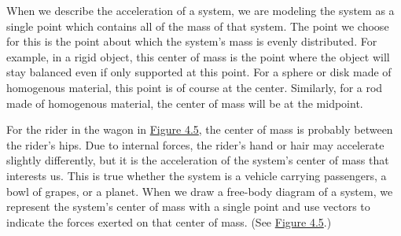\documentclass[
]{book}
\begin{document}
When we describe the acceleration of a system, we are modeling the
system as a single point which contains all of the mass of that system.
The point we choose for this is the point about which the system's mass
is evenly distributed. For example, in a rigid object, this center of
mass is the point where the object will stay balanced even if only
supported at this point. For a sphere or disk made of homogenous
material, this point is of course at the center. Similarly, for a rod
made of homogenous material, the center of mass will be at the midpoint.

For the rider in the wagon in \protect\hyperlink{import-auto-id1993910}{Figure 4.5}, the
center of mass is probably between the rider's hips. Due to internal
forces, the rider's hand or hair may accelerate slightly differently,
but it is the acceleration of the system's center of mass that interests
us. This is true whether the system is a vehicle carrying passengers, a
bowl of grapes, or a planet. When we draw a free-body diagram of a
system, we represent the system's center of mass with a single point and
use vectors to indicate the forces exerted on that center of mass. (See
\protect\hyperlink{import-auto-id1993910}{Figure 4.5}.)
\end{document}
